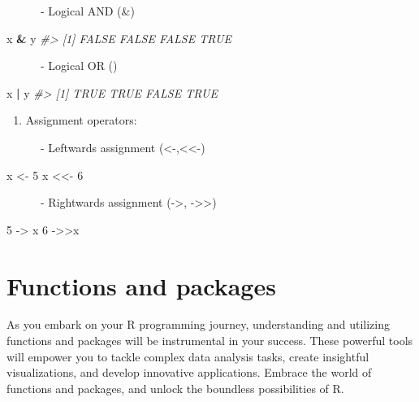 \documentclass[
]{book}
\newenvironment{Shaded}{\begin{snugshade}}{\end{snugshade}}
\newcommand{\CommentTok}[1]{\textcolor[rgb]{0.56,0.35,0.01}{\textit{#1}}}
\newcommand{\DecValTok}[1]{\textcolor[rgb]{0.00,0.00,0.81}{#1}}
\newcommand{\NormalTok}[1]{#1}
\newcommand{\OtherTok}[1]{\textcolor[rgb]{0.56,0.35,0.01}{#1}}
\newcommand{\SpecialCharTok}[1]{\textcolor[rgb]{0.81,0.36,0.00}{\textbf{#1}}}
\providecommand{\tightlist}{%
  \setlength{\itemsep}{0pt}\setlength{\parskip}{0pt}}
\begin{document}
~~~~~~- Logical AND (\&)

\begin{Shaded}
\begin{Highlighting}[]
\NormalTok{x }\SpecialCharTok{\&}\NormalTok{ y}
\CommentTok{\#\textgreater{} [1] FALSE FALSE FALSE  TRUE}
\end{Highlighting}
\end{Shaded}

~~~~~~- Logical OR (\textbar)

\begin{Shaded}
\begin{Highlighting}[]
\NormalTok{x }\SpecialCharTok{|}\NormalTok{ y}
\CommentTok{\#\textgreater{} [1]  TRUE  TRUE FALSE  TRUE}
\end{Highlighting}
\end{Shaded}

\begin{enumerate}
\def\labelenumi{\arabic{enumi}.}
\setcounter{enumi}{3}
\tightlist
\item
  Assignment operators:
\end{enumerate}

~~~~~~- Leftwards assignment (\textless-,\textless\textless-)

\begin{Shaded}
\begin{Highlighting}[]
\NormalTok{x }\OtherTok{\textless{}{-}} \DecValTok{5}
\NormalTok{x }\OtherTok{\textless{}\textless{}{-}} \DecValTok{6}
\end{Highlighting}
\end{Shaded}

~~~~~~- Rightwards assignment (-\textgreater, -\textgreater\textgreater)

\begin{Shaded}
\begin{Highlighting}[]
\DecValTok{5} \OtherTok{{-}\textgreater{}}\NormalTok{ x}
\DecValTok{6} \OtherTok{{-}\textgreater{}\textgreater{}}\NormalTok{x}
\end{Highlighting}
\end{Shaded}

\hypertarget{functions-and-packages}{%
\chapter{Functions and packages}\label{functions-and-packages}}

As you embark on your R programming journey, understanding and utilizing functions and packages will be instrumental in your success. These powerful tools will empower you to tackle complex data analysis tasks, create insightful visualizations, and develop innovative applications. Embrace the world of functions and packages, and unlock the boundless possibilities of R.
\end{document}
